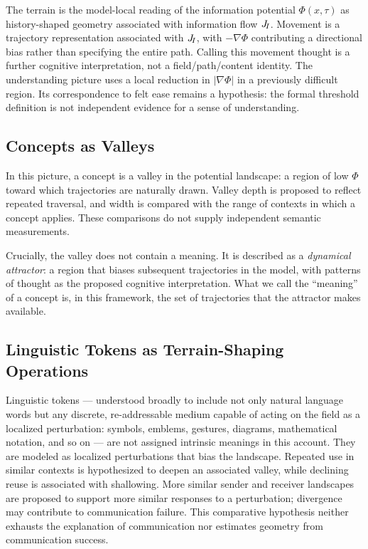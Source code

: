 The terrain is the model-local reading of the information potential
$\Phi(x,\tau)$ as history-shaped geometry associated with information flow
$J_{\!I}$. Movement is a trajectory representation associated with
$J_{\!I}$, with $-\nabla\Phi$ contributing a directional bias rather than
specifying the entire path. Calling this movement thought is a further
cognitive interpretation, not a field/path/content identity.
The understanding picture uses a local reduction in $|\nabla\Phi|$
in a previously difficult region. Its correspondence to felt ease remains
a hypothesis: the formal threshold definition is not independent evidence
for a sense of understanding.

\subsection{Concepts as Valleys}

In this picture, a concept is a valley in the potential landscape:
a region of low $\Phi$ toward which trajectories are naturally drawn.
Valley depth is proposed to reflect repeated traversal, and width is
compared with the range of contexts in which a concept applies. These
comparisons do not supply independent semantic measurements.

Crucially, the valley does not contain a meaning.
It is described as a \emph{dynamical attractor}: a region that biases
subsequent trajectories in the model, with patterns of thought as the
proposed cognitive interpretation.
What we call the ``meaning'' of a concept is, in this framework,
the set of trajectories that the attractor makes available.

\subsection{Linguistic Tokens as Terrain-Shaping Operations}

Linguistic tokens --- understood broadly to include not only natural
language words but any discrete, re-addressable medium capable of acting
on the field as a localized perturbation: symbols, emblems, gestures,
diagrams, mathematical notation, and so on --- are not assigned intrinsic
meanings in this account.
They are modeled as localized perturbations that bias the landscape.
Repeated use in similar contexts is hypothesized to deepen an associated
valley, while declining reuse is associated with shallowing.
More similar sender and receiver landscapes are proposed to support more
similar responses to a perturbation; divergence may contribute to
communication failure. This comparative hypothesis neither exhausts the
explanation of communication nor estimates geometry from communication
success.

